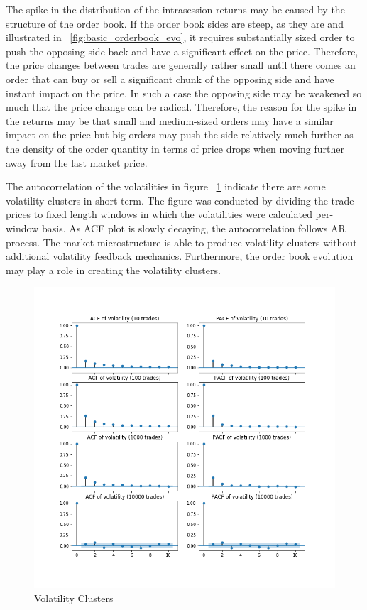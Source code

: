 The spike in the distribution of the intrasession returns may be caused by the structure of the order book. If the order book 
sides are steep, as they are and illustrated in ~\ref{fig:basic_orderbook_evo}, it requires substantially sized 
order to push the opposing side back and have a significant effect on the price. Therefore, the price changes between trades 
are generally rather small until there comes an order that can buy or sell a significant chunk of the opposing side and have 
instant impact on the price. In such a case the opposing side may be weakened so much that the price change can be radical. 
Therefore, the reason for the spike in the returns may be that small and medium-sized orders may have a similar impact on the 
price but big orders may push the side relatively much further as the density of the order quantity in terms of price drops 
when moving further away from the last market price.

The autocorrelation of the volatilities in figure ~\ref{fig:basic_volaclusters}
indicate there are some volatility clusters in short term. The figure was conducted by
dividing the trade prices to fixed length windows in which the volatilities were calculated per-window 
basis. As ACF plot is slowly decaying, the autocorrelation follows AR process. The market 
microstructure is able to produce volatility clusters without additional volatility feedback mechanics.
Furthermore, the order book evolution may play a role in creating the volatility clusters.

\begin{figure}[H]
    \includegraphics[width=\linewidth]{plots/basic_volaclusters_intra.png}
    \caption{Volatility Clusters}
    \label{fig:basic_volaclusters}
\end{figure}

